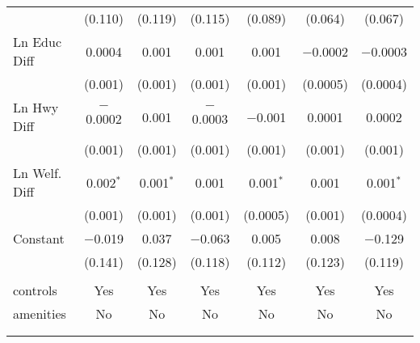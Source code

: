 \begin{table}[!htbp]
\begin{tabular}{@{\extracolsep{5pt}}lcccccc}
  & (0.110) & (0.119) & (0.115) & (0.089) & (0.064) & (0.067) \\ 
  Ln Educ Diff & 0.0004 & 0.001 & 0.001 & 0.001 & $-$0.0002 & $-$0.0003 \\ 
  & (0.001) & (0.001) & (0.001) & (0.001) & (0.0005) & (0.0004) \\ 
  Ln Hwy Diff & $-$0.0002 & 0.001 & $-$0.0003 & $-$0.001 & 0.0001 & 0.0002 \\ 
  & (0.001) & (0.001) & (0.001) & (0.001) & (0.001) & (0.001) \\ 
  Ln Welf. Diff & 0.002$^{*}$ & 0.001$^{*}$ & 0.001 & 0.001$^{*}$ & 0.001 & 0.001$^{*}$ \\ 
  & (0.001) & (0.001) & (0.001) & (0.0005) & (0.001) & (0.0004) \\ 
  Constant & $-$0.019 & 0.037 & $-$0.063 & 0.005 & 0.008 & $-$0.129 \\ 
  & (0.141) & (0.128) & (0.118) & (0.112) & (0.123) & (0.119) \\ 
 \hline \\[-1.8ex] 
controls & Yes & Yes & Yes & Yes & Yes & Yes \\ 
amenities & No & No & No & No & No & No \\ 
\hline \\[-1.8ex] 
\hline 
\hline \\[-1.8ex] 
\end{tabular} 
\end{table} 
